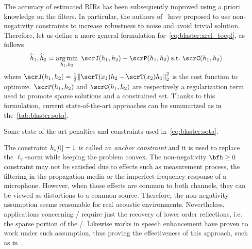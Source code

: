 \mynewline
The accuracy of estimated \acp{RIR} has been subsequently improved using a priori knowledge on the filters.
In particular, the authors of~ have proposed to use non-negativity constraints to increase robustness to noise and avoid trivial solution.
Therefore, let us define a more general formulation for~\cref{eq:blaster:xrel_toepl}, as follows
\begin{equation}\label{eq:blaster:sota}
    \disFilterHat_1, \disFilterHat_2
    =
    \kargmin_{\disFilter_1, \disFilter_2}
    \;
    \scrJ(\disFilter_1, \disFilter_2) + \scrP(\disFilter_1, \disFilter_2)
    \;\text{s.t.}\;
    \scrC(\disFilter_1, \disFilter_2)
\end{equation}
where $\scrJ(\disFilter_1, \disFilter_2) = \tfrac{1}{2} \kvvbar{\scrT(\disRecordedSignal_1) \disFilter_2 - \scrT(\disRecordedSignal_2) \disFilter_1}_2^2$ is the cost function to optimize.
$\scrP(\disFilter_1, \disFilter_2)$ and $\scrC(\disFilter_1, \disFilter_2)$ are respectively a regularization term used to promote sparse solutions and a constrained set.
Thanks to this formulation, current state-of-the-art approaches can be summarized as in the~\cref{tab:blaster:sota}.

\begin{table}[!h]

    \begin{fullwidth}
        \centering
        \small
        

        \caption{Some state-of-the-art penalties and constraints used in~\cref{eq:blaster:sota}.}
        \label{tab:blaster:sota}
    \end{fullwidth}
\end{table}

\mynewline
The constraint $h_i[0]=1$ is called an \textit{anchor constraint} and it is used to replace the $\ell_2$-norm while keeping the problem convex.
The non-negativity $\bfh \geq 0$ constraint may not be satisfied due to effects such as measurement process, the filtering in the propagation media or the imperfect frequency response of a microphone.
However, when those effects are common to both channels, they can be viewed as distortions to a common source.
Therefore, the non-negativity assumption seems reasonable for real acoustic environments.
Nevertheless, applications concerning \RooGE/ require just the recovery of lower order reflections, i.e. the sparse portion of the \RIR/.
Likewise works in speech enhancement have proven to work under such assumption, thus proving the effectiveness of this approach, such as in~.

